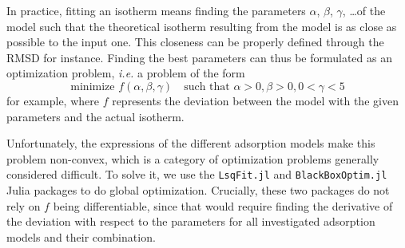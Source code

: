 \documentclass[main.tex]{subfiles}
\begin{document}
In practice, fitting an isotherm means finding the parameters $\alpha$, $\beta$, $\gamma$, \ldots of the model such that the theoretical isotherm resulting from the model is as close as possible to the input one. This closeness can be properly defined through the RMSD for instance. Finding the best parameters can thus be formulated as an optimization problem, \textit{i.e.} a problem of the form
\[\text{minimize }f(\alpha, \beta, \gamma)\quad\text{such that }\alpha>0, \beta>0, 0<\gamma<5\]
for example, where $f$ represents the deviation between the model with the given parameters and the actual isotherm.

Unfortunately, the expressions of the different adsorption models make this problem non-convex, which is a category of optimization problems generally considered difficult. To solve it, we use the \texttt{LsqFit.jl} and \texttt{BlackBoxOptim.jl} Julia packages to do global optimization. Crucially, these two packages do not rely on $f$ being differentiable, since that would require finding the derivative of the deviation with respect to the parameters for all investigated adsorption models and their combination.
\end{document}
